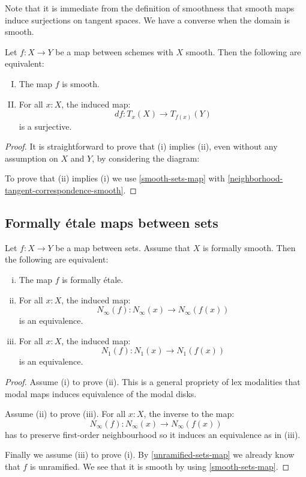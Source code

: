 Note that it is immediate from the definition of smoothness that smooth maps induce surjections on tangent spaces. We have a converse when the domain is smooth.

\begin{corollary}
Let $f:X\to Y$ be a map between schemes with $X$ smooth. Then the following are equivalent:
\begin{enumerate}[(I)] 
\item The map $f$ is smooth.
\item For all $x:X$, the induced map:
\[df : T_x(X)\to T_{f(x)}(Y)\]
is a surjective.
\end{enumerate}
\end{corollary}

\begin{proof}
It is straightforward to prove that (i) implies (ii), even without any assumption on $X$ and $Y$, by considering the diagram:
 \begin{center}
    \end{center}
To prove that (ii) implies (i) we use \cref{smooth-sets-map} with \cref{neighborhood-tangent-correspondence-smooth}.
\end{proof}


\subsection{Formally étale maps between sets}

\begin{proposition}\label{etale-sets-map}
Let $f:X\to Y$ be a map between sets. Assume that $X$ is formally smooth. Then the following are equivalent:
\begin{enumerate}[(i)]
\item The map $f$ is formally étale. 
\item For all $x:X$, the induced map:
\[N_\infty(f) : N_\infty(x)\to N_\infty(f(x))\]
is an equivalence.
\item For all $x:X$, the induced map:
\[N_1(f) : N_1(x)\to N_1(f(x))\]
is an equivalence.
\end{enumerate}
\end{proposition}

\begin{proof}
Assume (i) to prove (ii). This is a general propriety of lex modalities that modal maps induces equivalence of the modal disks.

Assume (ii) to prove (iii). For all $x:X$, the inverse to the map: 
\[N_\infty(f) : N_\infty(x)\to N_\infty(f(x))\]
has to preserve first-order neighbourhood so it induces an equivalence as in (iii).

Finally we assume (iii) to prove (i). By \cref{unramified-sets-map} we already know that $f$ is unramified. We see that it is smooth by using \cref{smooth-sets-map}.
\end{proof}

